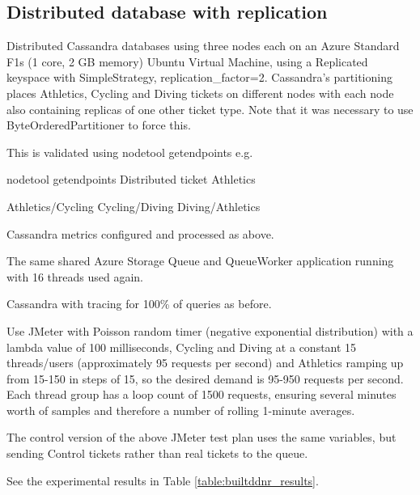 %
%
\subsection{Distributed database with replication}

\begin{shaded}
Distributed Cassandra databases using three nodes each on an Azure Standard F1s (1 core, 2 GB memory) Ubuntu Virtual Machine, using a Replicated keyspace with SimpleStrategy, replication\_factor=2.  Cassandra's partitioning places Athletics, Cycling and Diving tickets on different nodes with each node also containing replicas of one other ticket type.  Note that it was necessary to use ByteOrderedPartitioner to force this.

This is validated using nodetool getendpoints e.g.

nodetool getendpoints Distributed ticket Athletics

Athletics/Cycling
Cycling/Diving
Diving/Athletics

Cassandra metrics configured and processed as above.

The same shared Azure Storage Queue and QueueWorker application running with 16 threads used again.

Cassandra with tracing for 100\% of queries as before.

Use JMeter with Poisson random timer (negative exponential distribution) with a lambda value of 100 milliseconds, Cycling and Diving at a constant 15 threads/users (approximately 95 requests per second) and Athletics ramping up from 15-150 in steps of 15, so the desired demand is 95-950 requests per second.  Each thread group has a loop count of 1500 requests, ensuring several minutes worth of samples and therefore a number of rolling 1-minute averages.

The control version of the above JMeter test plan uses the same variables, but sending Control tickets rather than real tickets to the queue.

See the experimental results in Table \ref{table:builtddnr_results}.
\end{shaded}